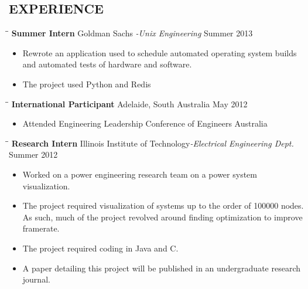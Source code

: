 \documentclass{res}
\begin{document}
\begin{resume}
\section{EXPERIENCE}
   \vspace{-0.1in}	
   \begin{tabbing}
   \hspace{1.3in}\= \hspace{3.6in}\= \kill %
    {\bf Summer Intern} \>Goldman Sachs \emph{\small{-Unix Engineering}} \>Summer 2013\\
   \end{tabbing}\vspace{-20pt}
   \begin{itemize}
     \item Rewrote an application used to schedule automated operating system builds and automated tests of hardware and software.
     \item The project used Python and Redis
   \end{itemize}

   \begin{tabbing}
   \hspace{2.3in}\= \hspace{2.6in}\= \kill %
   {\bf International Participant}  \>Adelaide, South Australia \> May 2012\\
   \end{tabbing}\vspace{-20pt}
   \begin{itemize}
       \item Attended Engineering Leadership Conference of Engineers Australia
   \end{itemize}

   \begin{tabbing}
   \hspace{1.3in}\= \hspace{3.6in}\= \kill %
    {\bf Research Intern} \>Illinois Institute of Technology\emph{\small{-Electrical Engineering Dept.}} \>Summer 2012\\
   \end{tabbing}\vspace{-20pt}
   \begin{itemize}
     \item Worked on a power engineering research team on a power system visualization. 
     \item The project required visualization of systems up to the order of 100000 nodes. As such, much of the project revolved around finding optimization to improve framerate.
     \item The project required coding in Java and C.
     \item A paper detailing this project will be published in an undergraduate research journal.
   \end{itemize}


\end{resume}
\end{document}
